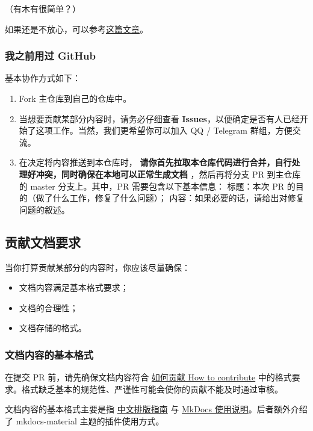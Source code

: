（有木有很简单？）

如果还是不放心，可以参考\href{https://juejin.im/entry/56e638591ea49300550885cc}{这篇文章}。

\subsubsection{我之前用过 GitHub}

基本协作方式如下：

\begin{enumerate}
\item Fork 主仓库到自己的仓库中。
\item 当想要贡献某部分内容时，请务必仔细查看 \textbf{Issues}，以便确定是否有人已经开始了这项工作。当然，我们更希望你可以加入 QQ / Telegram 群组，方便交流。
\item 在决定将内容推送到本仓库时，\textbf{ 请你首先拉取本仓库代码进行合并，自行处理好冲突，同时确保在本地可以正常生成文档 }，然后再将分支 PR 到主仓库的 master 分支上。其中，PR 需要包含以下基本信息：
标题：本次 PR 的目的（做了什么工作，修复了什么问题）；
内容：如果必要的话，请给出对修复问题的叙述。
\end{enumerate}

\subsection{贡献文档要求}

当你打算贡献某部分的内容时，你应该尽量确保：

\begin{itemize}
\item 文档内容满足基本格式要求；
\item 文档的合理性；
\item 文档存储的格式。
\end{itemize}

\subsubsection{文档内容的基本格式}

在提交 PR 前，请先确保文档内容符合 \href{https://github.com/24OI/OI-wiki/wiki/\%E5%A6%82%E4%BD%95%E8%B4%A1%E7%8C%AE---How-to-contribute}{如何贡献 How to contribute} 中的格式要求。格式缺乏基本的规范性、严谨性可能会使你的贡献不能及时通过审核。

文档内容的基本格式主要是指 \href{https://github.com/ctf-wiki/ctf-wiki/wiki/\%E4%B8%AD%E6%96%87%E6%8E%92%E7%89%88%E6%8C%87%E5%8D%97}{中文排版指南} 与 \href{https://github.com/ctf-wiki/ctf-wiki/wiki/Mkdocs-\%E4%BD%BF%E7%94%A8%E8%AF%B4%E6%98%8E}{MkDocs 使用说明}。后者额外介绍了 mkdocs-material 主题的插件使用方式。

